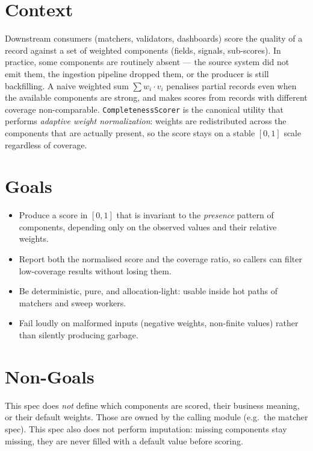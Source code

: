 




\makespecheader

\section{Context}
Downstream consumers (matchers, validators, dashboards) score the quality of a record against a set of weighted components (fields, signals, sub-scores). In practice, some components are routinely absent --- the source system did not emit them, the ingestion pipeline dropped them, or the producer is still backfilling. A naive weighted sum \(\sum w_i \cdot v_i\) penalises partial records even when the available components are strong, and makes scores from records with different coverage non-comparable. \texttt{CompletenessScorer} is the canonical utility that performs \emph{adaptive weight normalization}: weights are redistributed across the components that are actually present, so the score stays on a stable \([0, 1]\) scale regardless of coverage.

\section{Goals}
\begin{itemize}[leftmargin=1.2em]
  \item Produce a score in \([0, 1]\) that is invariant to the \emph{presence} pattern of components, depending only on the observed values and their relative weights.
  \item Report both the normalised score and the coverage ratio, so callers can filter low-coverage results without losing them.
  \item Be deterministic, pure, and allocation-light: usable inside hot paths of matchers and sweep workers.
  \item Fail loudly on malformed inputs (negative weights, non-finite values) rather than silently producing garbage.
\end{itemize}

\section{Non-Goals}
\begin{nongoal}
This spec does \emph{not} define which components are scored, their business meaning, or their default weights. Those are owned by the calling module (e.g.\ the matcher spec). This spec also does not perform imputation: missing components stay missing, they are never filled with a default value before scoring.
\end{nongoal}

